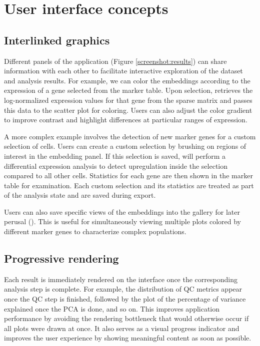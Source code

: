 \documentclass{article}
\begin{document}
\section{User interface concepts}

\subsection{Interlinked graphics}

Different panels of the  application (Figure \ref{screenshot:results}) can share information with each other to facilitate interactive exploration of the dataset and analysis results.
For example, we can color the embeddings according to the expression of a gene selected from the marker table.
Upon selection,  retrieves the log-normalized expression values for that gene from the sparse matrix and passes this data to the scatter plot for coloring.
Users can also adjust the color gradient to improve contrast and highlight differences at particular ranges of expression.

A more complex example involves the detection of new marker genes for a custom selection of cells.
Users can create a custom selection by brushing on regions of interest in the embedding panel.
If this selection is saved,  will perform a differential expression analysis to detect upregulation inside the selection compared to all other cells.
Statistics for each gene are then shown in the marker table for examination.
Each custom selection and its statistics are treated as part of the analysis state and are saved during export.

Users can also save specific views of the embeddings into the gallery for later perusal ().
This is useful for simultaneously viewing multiple plots colored by different marker genes to characterize complex populations.

\subsection{Progressive rendering}

Each result is immediately rendered on the interface once the corresponding analysis step is complete.
For example, the distribution of QC metrics appear once the QC step is finished, followed by the plot of the percentage of variance explained once the PCA is done, and so on.
This improves application performance by avoiding the rendering bottleneck that would otherwise occur if all plots were drawn at once. 
It also serves as a visual progress indicator and improves the user experience by showing meaningful content as soon as possible.
\end{document}
